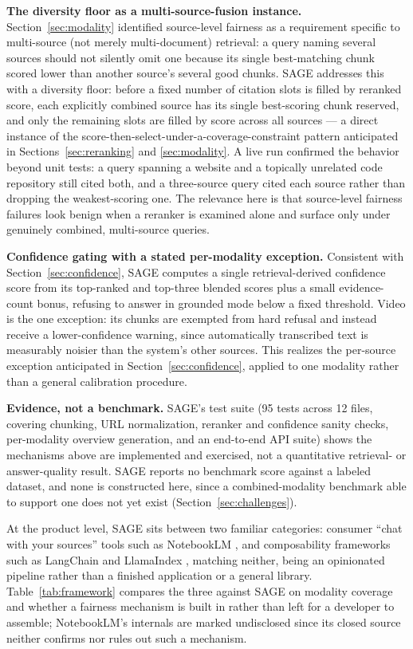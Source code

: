\documentclass[conference]{IEEEtran}
\begin{document}
\textbf{The diversity floor as a multi-source-fusion instance.} Section~\ref{sec:modality} identified source-level fairness as a requirement specific to multi-source (not merely multi-document) retrieval: a query naming several sources should not silently omit one because its single best-matching chunk scored lower than another source's several good chunks. SAGE addresses this with a diversity floor: before a fixed number of citation slots is filled by reranked score, each explicitly combined source has its single best-scoring chunk reserved, and only the remaining slots are filled by score across all sources — a direct instance of the score-then-select-under-a-coverage-constraint pattern anticipated in Sections~\ref{sec:reranking} and \ref{sec:modality}. A live run confirmed the behavior beyond unit tests: a query spanning a website and a topically unrelated code repository still cited both, and a three-source query cited each source rather than dropping the weakest-scoring one. The relevance here is that source-level fairness failures look benign when a reranker is examined alone and surface only under genuinely combined, multi-source queries.

\textbf{Confidence gating with a stated per-modality exception.} Consistent with Section~\ref{sec:confidence}, SAGE computes a single retrieval-derived confidence score from its top-ranked and top-three blended scores plus a small evidence-count bonus, refusing to answer in grounded mode below a fixed threshold. Video is the one exception: its chunks are exempted from hard refusal and instead receive a lower-confidence warning, since automatically transcribed text is measurably noisier than the system's other sources. This realizes the per-source exception anticipated in Section~\ref{sec:confidence}, applied to one modality rather than a general calibration procedure.

\textbf{Evidence, not a benchmark.} SAGE's test suite (95 tests across 12 files, covering chunking, URL normalization, reranker and confidence sanity checks, per-modality overview generation, and an end-to-end API suite) shows the mechanisms above are implemented and exercised, not a quantitative retrieval- or answer-quality result. SAGE reports no benchmark score against a labeled dataset, and none is constructed here, since a combined-modality benchmark able to support one does not yet exist (Section~\ref{sec:challenges}).

At the product level, SAGE sits between two familiar categories: consumer ``chat with your sources'' tools such as NotebookLM \cite{notebooklm2023}, and composability frameworks such as LangChain \cite{langchain} and LlamaIndex \cite{llamaindex}, matching neither, being an opinionated pipeline rather than a finished application or a general library. Table~\ref{tab:framework} compares the three against SAGE on modality coverage and whether a fairness mechanism is built in rather than left for a developer to assemble; NotebookLM's internals are marked undisclosed since its closed source neither confirms nor rules out such a mechanism.
\end{document}
